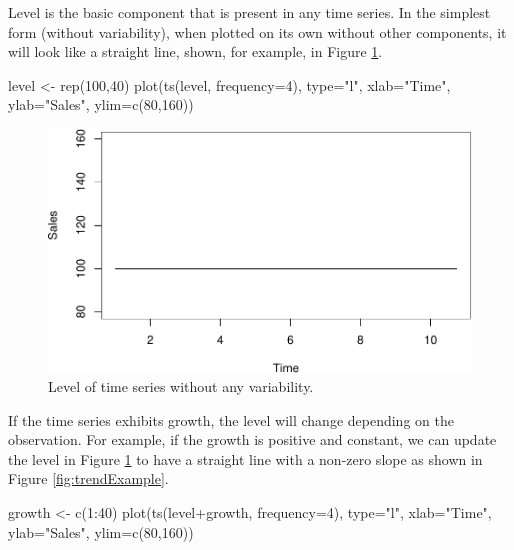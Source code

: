\documentclass[
]{book}
\newenvironment{Shaded}{\begin{snugshade}}{\end{snugshade}}
\newcommand{\AttributeTok}[1]{\textcolor[rgb]{0.77,0.63,0.00}{#1}}
\newcommand{\DecValTok}[1]{\textcolor[rgb]{0.00,0.00,0.81}{#1}}
\newcommand{\FunctionTok}[1]{\textcolor[rgb]{0.00,0.00,0.00}{#1}}
\newcommand{\NormalTok}[1]{#1}
\newcommand{\OtherTok}[1]{\textcolor[rgb]{0.56,0.35,0.01}{#1}}
\newcommand{\SpecialCharTok}[1]{\textcolor[rgb]{0.00,0.00,0.00}{#1}}
\newcommand{\StringTok}[1]{\textcolor[rgb]{0.31,0.60,0.02}{#1}}
\theoremstyle{definition}
\theoremstyle{definition}
\theoremstyle{definition}
\theoremstyle{definition}
\theoremstyle{remark}
\begin{document}
Level is the basic component that is present in any time series. In the simplest form (without variability), when plotted on its own without other components, it will look like a straight line, shown, for example, in Figure \ref{fig:levelExample}.

\begin{Shaded}
\begin{Highlighting}[]
\NormalTok{level }\OtherTok{\textless{}{-}} \FunctionTok{rep}\NormalTok{(}\DecValTok{100}\NormalTok{,}\DecValTok{40}\NormalTok{)}
\FunctionTok{plot}\NormalTok{(}\FunctionTok{ts}\NormalTok{(level, }\AttributeTok{frequency=}\DecValTok{4}\NormalTok{),}
     \AttributeTok{type=}\StringTok{"l"}\NormalTok{, }\AttributeTok{xlab=}\StringTok{"Time"}\NormalTok{, }\AttributeTok{ylab=}\StringTok{"Sales"}\NormalTok{, }\AttributeTok{ylim=}\FunctionTok{c}\NormalTok{(}\DecValTok{80}\NormalTok{,}\DecValTok{160}\NormalTok{))}
\end{Highlighting}
\end{Shaded}

\begin{figure}
\centering
\includegraphics{adam_files/figure-latex/levelExample-1.pdf}
\caption{\label{fig:levelExample}Level of time series without any variability.}
\end{figure}

If the time series exhibits growth, the level will change depending on the observation. For example, if the growth is positive and constant, we can update the level in Figure \ref{fig:levelExample} to have a straight line with a non-zero slope as shown in Figure \ref{fig:trendExample}.

\begin{Shaded}
\begin{Highlighting}[]
\NormalTok{growth }\OtherTok{\textless{}{-}} \FunctionTok{c}\NormalTok{(}\DecValTok{1}\SpecialCharTok{:}\DecValTok{40}\NormalTok{)}
\FunctionTok{plot}\NormalTok{(}\FunctionTok{ts}\NormalTok{(level}\SpecialCharTok{+}\NormalTok{growth, }\AttributeTok{frequency=}\DecValTok{4}\NormalTok{),}
     \AttributeTok{type=}\StringTok{"l"}\NormalTok{, }\AttributeTok{xlab=}\StringTok{"Time"}\NormalTok{, }\AttributeTok{ylab=}\StringTok{"Sales"}\NormalTok{, }\AttributeTok{ylim=}\FunctionTok{c}\NormalTok{(}\DecValTok{80}\NormalTok{,}\DecValTok{160}\NormalTok{))}
\end{Highlighting}
\end{Shaded}
\end{document}

